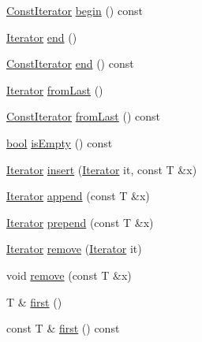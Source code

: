 \begin{DoxyCompactItemize}
\item 
\hyperlink{class_q_value_list_a945cde34d45626792d1c5c8012b9b680}{Const\+Iterator} \hyperlink{class_q_value_list_a5230874404d6bbfdcbbb08be4d0a65e9}{begin} () const 
\item 
\hyperlink{class_q_value_list_a043c8661906b45f062d493601804a5ea}{Iterator} \hyperlink{class_q_value_list_a71dc81b4baa045f6b672cc8a5bcca266}{end} ()
\item 
\hyperlink{class_q_value_list_a945cde34d45626792d1c5c8012b9b680}{Const\+Iterator} \hyperlink{class_q_value_list_aa1ded68a877d6b79239d4575ffbd3bb2}{end} () const 
\item 
\hyperlink{class_q_value_list_a043c8661906b45f062d493601804a5ea}{Iterator} \hyperlink{class_q_value_list_af278cd0ce9c58f5067b7c1cdaf854964}{from\+Last} ()
\item 
\hyperlink{class_q_value_list_a945cde34d45626792d1c5c8012b9b680}{Const\+Iterator} \hyperlink{class_q_value_list_aec473d0ed17ae33ee2f2e15ec815eecd}{from\+Last} () const 
\item 
\hyperlink{qglobal_8h_a1062901a7428fdd9c7f180f5e01ea056}{bool} \hyperlink{class_q_value_list_a2603e5fba89ca5347e5e85322e695341}{is\+Empty} () const 
\item 
\hyperlink{class_q_value_list_a043c8661906b45f062d493601804a5ea}{Iterator} \hyperlink{class_q_value_list_a2fb443daa55b5addda34fb132c43bf91}{insert} (\hyperlink{class_q_value_list_a043c8661906b45f062d493601804a5ea}{Iterator} it, const T \&x)
\item 
\hyperlink{class_q_value_list_a043c8661906b45f062d493601804a5ea}{Iterator} \hyperlink{class_q_value_list_a16e986bb0fabab54a99ee2cbf2498da6}{append} (const T \&x)
\item 
\hyperlink{class_q_value_list_a043c8661906b45f062d493601804a5ea}{Iterator} \hyperlink{class_q_value_list_ad5e9e4e3cc8463205b2b4a6411fae002}{prepend} (const T \&x)
\item 
\hyperlink{class_q_value_list_a043c8661906b45f062d493601804a5ea}{Iterator} \hyperlink{class_q_value_list_a229f99c52bf947c4b42a0a1c8c42b42a}{remove} (\hyperlink{class_q_value_list_a043c8661906b45f062d493601804a5ea}{Iterator} it)
\item 
void \hyperlink{class_q_value_list_a7bc042cdc885791274ade25ef3679b3f}{remove} (const T \&x)
\item 
T \& \hyperlink{class_q_value_list_adfdbb688741c3de3d41942016ce47e93}{first} ()
\item 
const T \& \hyperlink{class_q_value_list_a2ec799234032176a7995d135264e204f}{first} () const 

\end{DoxyCompactItemize}
